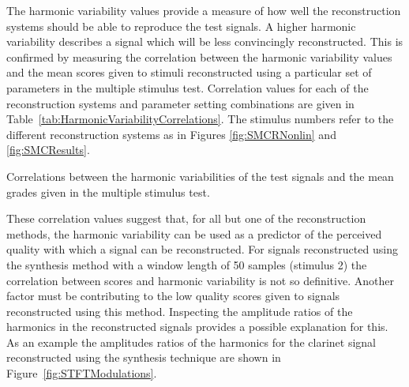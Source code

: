 		The harmonic variability values provide a measure of how well the reconstruction systems should be able to
		reproduce the test signals. A higher harmonic variability describes a signal which will be less
		convincingly reconstructed. This is confirmed by measuring the correlation between the harmonic variability
		values and the mean scores given to stimuli reconstructed using a particular set of parameters in the
		multiple stimulus test. Correlation values for each of the reconstruction systems and parameter setting
		combinations are given in Table~\ref{tab:HarmonicVariabilityCorrelations}. The stimulus numbers refer to
		the different reconstruction systems as in Figures \ref{fig:SMCRNonlin} and \ref{fig:SMCResults}.

		\begin{table}[h!]
			\centering
			
			\caption{Correlations between the harmonic variabilities of the test signals and 
				 the mean grades given in the multiple stimulus test.}
			\label{tab:HarmonicVariabilityCorrelations}
		\end{table}

		These correlation values suggest that, for all but one of the reconstruction methods, the harmonic
		variability can be used as a predictor of the perceived quality with which a signal can be reconstructed.
		For signals reconstructed using the synthesis method with a window length of 50 samples (stimulus 2) the
		correlation between scores and harmonic variability is not so definitive. Another factor must be
		contributing to the low quality scores given to signals reconstructed using this method. Inspecting the
		amplitude ratios of the harmonics in the reconstructed signals provides a possible explanation for this.
		As an example the amplitudes ratios of the harmonics for the clarinet signal reconstructed using the
		synthesis technique are shown in Figure~\ref{fig:STFTModulations}.

